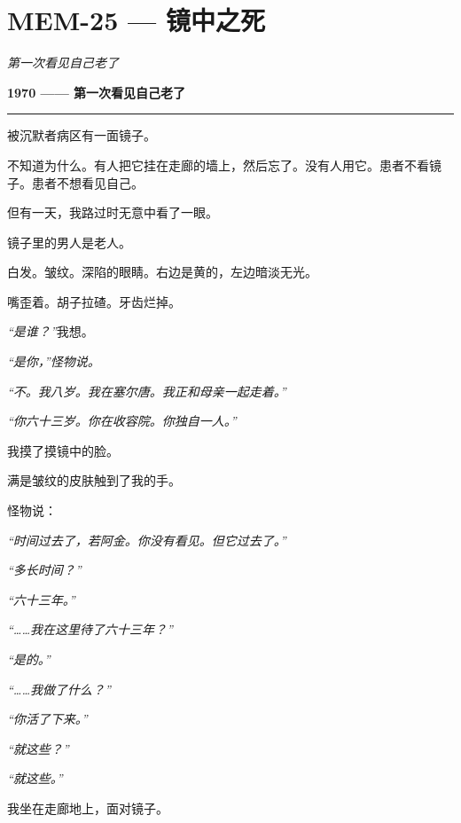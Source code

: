 \section*{\textbf{MEM-25} --- 镜中之死}

\noindent \textit{第一次看见自己老了}

\noindent \textbf{1970 —— 第一次看见自己老了}

\vspace{0.5em}\noindent\rule{\textwidth}{0.5pt}\vspace{0.5em}

\noindent 被沉默者病区有一面镜子。

\noindent 不知道为什么。有人把它挂在走廊的墙上，然后忘了。没有人用它。患者不看镜子。患者不想看见自己。

\noindent 但有一天，我路过时无意中看了一眼。

\noindent 镜子里的男人是老人。

\noindent 白发。皱纹。深陷的眼睛。右边是黄的，左边暗淡无光。

\noindent 嘴歪着。胡子拉碴。牙齿烂掉。

\noindent \textit{“是谁？”}我想。

\noindent \textit{“是你，”怪物说。}

\noindent \textit{“不。我八岁。我在塞尔唐。我正和母亲一起走着。”}

\noindent \textit{“你六十三岁。你在收容院。你独自一人。”}

\noindent 我摸了摸镜中的脸。

\noindent 满是皱纹的皮肤触到了我的手。

\noindent 怪物说：

\noindent \textit{“时间过去了，若阿金。你没有看见。但它过去了。”}

\noindent \textit{“多长时间？”}

\noindent \textit{“六十三年。”}

\noindent \textit{“……我在这里待了六十三年？”}

\noindent \textit{“是的。”}

\noindent \textit{“……我做了什么？”}

\noindent \textit{“你活了下来。”}

\noindent \textit{“就这些？”}

\noindent \textit{“就这些。”}

\noindent 我坐在走廊地上，面对镜子。


